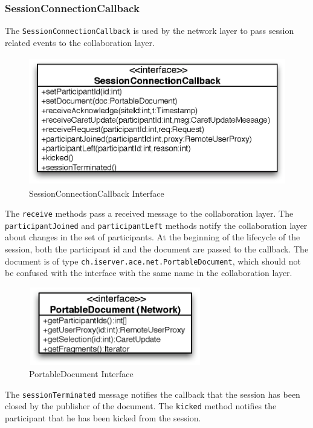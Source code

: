 \subsubsection{SessionConnectionCallback}
The \texttt{SessionConnectionCallback} is used by the network layer
to pass session related events to the collaboration layer.

\begin{figure}[H]
 \centering
 \includegraphics[width=11.50cm,height=5.57cm]{../images/finalreport/architecture_sessionconnectioncallback_uml.eps}
 \caption{SessionConnectionCallback Interface}
\end{figure}

The \texttt{receive} methods pass a received message to the collaboration
layer. The \texttt{participantJoined} and \texttt{participantLeft} methods
notify the collaboration layer about changes in the set of participants.
At the beginning of the lifecycle of the session, both the participant
id and the document are passed to the callback. The document is of
type \texttt{ch.\-iserver.\-ace.\-net.\-PortableDocument}, which should not
be confused with the interface with the same name in the collaboration
layer.

\begin{figure}[H]
 \centering
 \includegraphics[width=7.55cm,height=3.40cm]{../images/finalreport/architecture_portabledocumentnet_uml.eps}
 \caption{PortableDocument Interface}
\end{figure}

The \texttt{sessionTerminated} message notifies the callback that the 
session has been closed
by the publisher of the document. The \texttt{kicked} method notifies the
participant that he has been kicked from the session.


